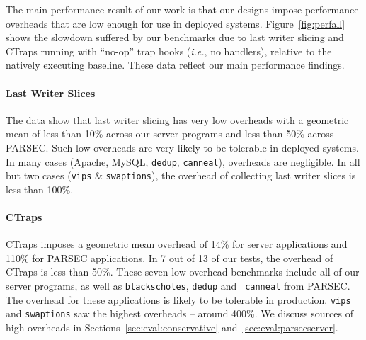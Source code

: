 \documentclass[preprint,9pt]{sigplanconf}
\newcommand{\ctraps}{CTraps\xspace}
\begin{document}
The main performance result of our work is that our designs impose performance
overheads that are low enough for use in deployed systems.
Figure~\ref{fig:perfall} shows the slowdown suffered by our benchmarks due to last writer slicing
and \ctraps running with ``no-op'' trap hooks ({\em i.e.}, no
handlers), relative to the natively executing baseline.  These data reflect
our main performance findings.    

\paragraph{Last Writer Slices}
The data show that last writer slicing has very low overheads with a geometric mean of less
than 10\% across our server programs and less than 50\% across PARSEC.  Such
low overheads are very likely to be tolerable in deployed systems.  In many
cases (Apache, MySQL, {\tt dedup}, {\tt canneal}), overheads are negligible.
In all but two cases ({\tt vips} \& {\tt swaptions}), the overhead of collecting last writer slices is
less than 100\%.    

\paragraph{\ctraps}
\ctraps imposes a geometric mean overhead of 14\% for server applications
and 110\% for PARSEC applications.  In 7 out of 13 of our tests, the overhead
of \ctraps is less than 50\%.  These seven low overhead benchmarks include
all of our server programs, as well as {\tt blackscholes}, {\tt dedup} and {\tt
canneal} from PARSEC.  The overhead for these applications is likely to be
tolerable in production.  {\tt vips} and {\tt swaptions} saw the highest
overheads -- around 400\%.  We discuss sources of high overheads in
Sections~\ref{sec:eval:conservative} and~\ref{sec:eval:parsecserver}.
\end{document}
